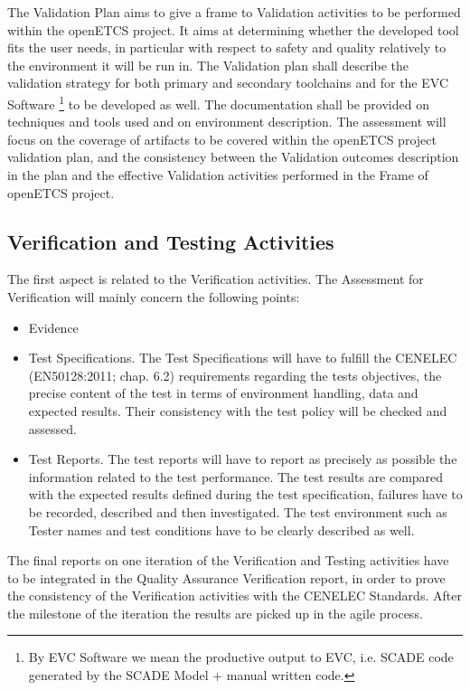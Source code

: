 \documentclass[openetcs]{template/openetcs_article}
\begin{document}
The Validation Plan aims to give a frame to Validation activities to be performed within the openETCS project. It aims at determining whether the developed tool
fits the user needs, in particular with respect to safety and quality relatively to the environment it will be run in.
The Validation plan shall describe the validation strategy for both primary and secondary toolchains and for the EVC Software \footnote{By EVC Software we mean the productive output to EVC, i.e. SCADE code generated by the SCADE Model + manual written code.} to be developed as well. The
documentation shall be provided on techniques and tools used and on environment description. The assessment will focus on the coverage of artifacts to be
covered within the openETCS project validation plan, and the consistency between the Validation outcomes description in the plan and the effective Validation
activities performed in the Frame of openETCS project.

\subsection{Verification and Testing Activities}
The first aspect is related to the Verification activities. The Assessment for Verification will mainly concern the following points:
\begin{itemize}
\item Evidence
\item Test Specifications. The Test Specifications will have to fulfill the CENELEC (EN50128:2011; chap. 6.2) requirements regarding the tests objectives, the precise content of the test
in terms of environment handling, data and expected results. Their consistency with the test policy will be checked and assessed.
\item Test Reports. The test reports will have to report as precisely as possible the information related to the test performance. The test results are compared
with the expected results defined during the test specification, failures have to be recorded, described and then investigated. The test environment such as
Tester names and test conditions have to be clearly described as well.
\end{itemize}
The final reports on one iteration of the Verification and Testing activities have to be integrated in the Quality Assurance Verification report, in order to prove the
consistency of the Verification activities with the CENELEC Standards. After the milestone of the iteration the results are picked up in the agile process.
\end{document}
